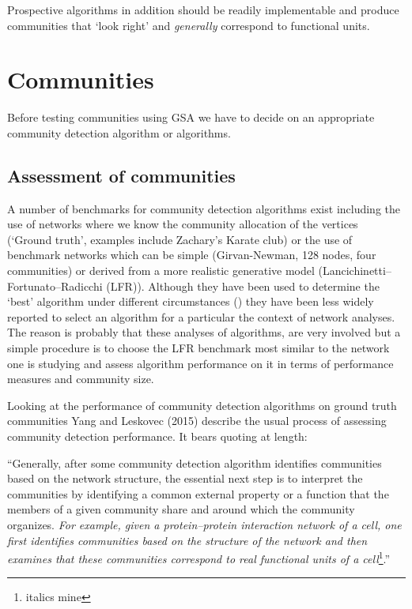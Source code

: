Prospective algorithms in addition should be readily implementable and produce communities that `look right' and \textit{generally} correspond to functional units. 


\section{Communities}
\label{sec:alternate intro}

 Before testing communities using GSA we have to decide on an appropriate community detection algorithm or algorithms.

\subsection{Assessment of communities}
\label{sec:assessment of communities}
A number of benchmarks for community detection algorithms exist including the use of networks where we know the community allocation of the vertices (`Ground truth'\cite{yang2015defining}, examples include Zachary's Karate club\cite{zachary1977information}) or the use of benchmark networks which can be simple (Girvan-Newman, 128 nodes, four communities\cite{girvan2002community}) or derived from a more realistic generative model (Lancichinetti–Fortunato–Radicchi (LFR)\cite{lancichinetti2008benchmark}). Although they have been used to determine the `best' algorithm under different circumstances (\cite{yang2016comparative}) they have been less widely reported to select an algorithm for a particular the context of network analyses. The reason is probably that these analyses of algorithms\cite{yang2016comparative}, \cite{aldecoa2013exploring} are very involved but a simple procedure is to choose the LFR benchmark most similar to the network one is studying and assess algorithm performance on it in terms of performance measures and community size. 

Looking at the performance of community detection algorithms on ground truth communities Yang and Leskovec (2015) describe the usual process of assessing community detection performance. It bears quoting at length:

``Generally, after some community detection algorithm identifies communities based on the network structure, the essential next step is to interpret the communities by identifying a common external property or a function that the members of a given community share and around which the community organizes. \textit{For example, given a protein–protein interaction network of a cell, one first identifies communities based on the structure of the network and then examines that these communities correspond to real functional units of a cell}\cite{yang2015defining}\footnote{italics mine}.'' 

